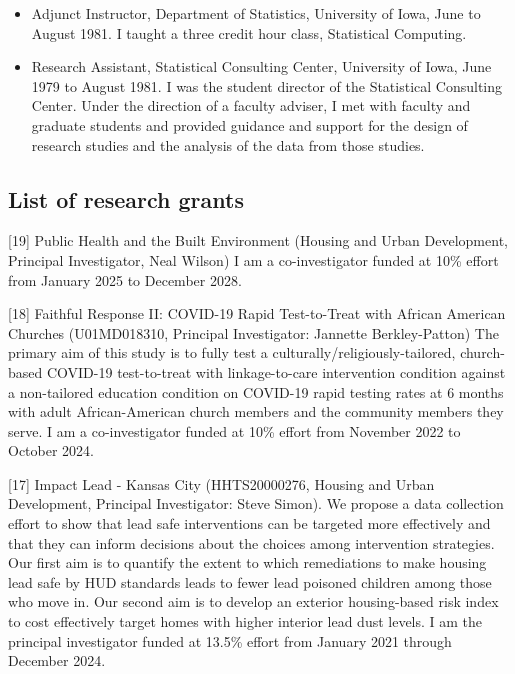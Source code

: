 \documentclass[
  12pt,
]{article}
\begin{document}
\begin{itemize}
  Research, Bowling Green State University, September 1981 to May 1987.
  Duties included teaching and research. I taught Business Statistics,
  Experimental Design, Linear Models, Multivariate Statistics,
  Nonparametric Statistics, and Linear Regression. I published articles
  and made presentations in the areas of numerical accuracy, robust
  statistics, and computer applications. During the Summer of 1986, I
  served as the Assistant Director of the Statistical Consulting Center.
\item
  Adjunct Instructor, Department of Statistics, University of Iowa, June
  to August 1981. I taught a three credit hour class, Statistical
  Computing.
\item
  Research Assistant, Statistical Consulting Center, University of Iowa,
  June 1979 to August 1981. I was the student director of the
  Statistical Consulting Center. Under the direction of a faculty
  adviser, I met with faculty and graduate students and provided
  guidance and support for the design of research studies and the
  analysis of the data from those studies.
\end{itemize}

\subsection{List of research grants}\label{list-of-research-grants}

{[}19{]} Public Health and the Built Environment (Housing and Urban
Development, Principal Investigator, Neal Wilson) I am a co-investigator
funded at 10\% effort from January 2025 to December 2028.

{[}18{]} Faithful Response II: COVID-19 Rapid Test-to-Treat with African
American Churches (U01MD018310, Principal Investigator: Jannette
Berkley-Patton) The primary aim of this study is to fully test a
culturally/religiously-tailored, church-based COVID-19 test-to-treat
with linkage-to-care intervention condition against a non-tailored
education condition on COVID-19 rapid testing rates at 6 months with
adult African-American church members and the community members they
serve. I am a co-investigator funded at 10\% effort from November 2022
to October 2024.

{[}17{]} Impact Lead - Kansas City (HHTS20000276, Housing and Urban
Development, Principal Investigator: Steve Simon). We propose a data
collection effort to show that lead safe interventions can be targeted
more effectively and that they can inform decisions about the choices
among intervention strategies. Our first aim is to quantify the extent
to which remediations to make housing lead safe by HUD standards leads
to fewer lead poisoned children among those who move in. Our second aim
is to develop an exterior housing-based risk index to cost effectively
target homes with higher interior lead dust levels. I am the principal
investigator funded at 13.5\% effort from January 2021 through December
2024.
\end{document}
